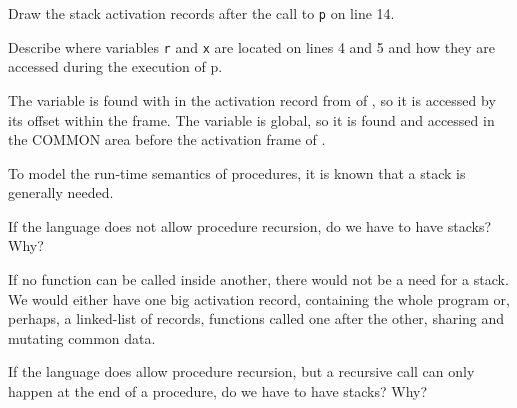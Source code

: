 \documentclass[12pt,letterpaper]{hmcpset}
\begin{document}
\begin{problem}[3b]
Draw the stack activation records after the call to \texttt{p} on line 14.
\end{problem}

\begin{solution}
\begin{drawstack}
\startframe
{}
\startframe
{}
\startframe
{} 
\startframe
{} 
\end{drawstack}
\end{solution}

\begin{problem}[3c]
Describe where variables \texttt{r} and \texttt{x} are located on lines 4 and 5 and how they are accessed during the execution of p.
\end{problem}

\begin{solution}
The variable  is found with in the activation record from of , so it is accessed by its offset within the frame.  The variable  is global, so it is found and accessed in the COMMON area before the activation frame of .
\end{solution}

\begin{problem}[4]
To model the run-time semantics of procedures, it is known that a stack is generally needed. 
\end{problem}

\begin{problem}[4a]
If the language does not allow procedure recursion, do we have to have stacks? Why?
\end{problem}

\begin{solution}
If no function can be called inside another, there would not be a need for a stack.  We would either have one big activation record, containing the whole program or, perhaps, a linked-list of records, functions called one after the other, sharing and mutating common data.
\end{solution}

\begin{problem}[4b]
If the language does allow procedure recursion, but a recursive call can only happen at the end of a procedure, do we have to have stacks? Why?
\end{problem}
\end{document}
